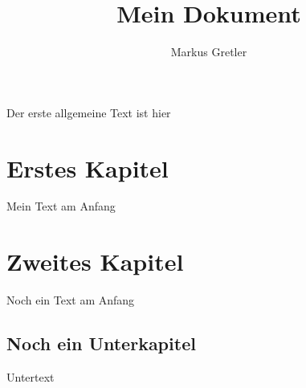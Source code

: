 \documentclass[a4paper, DIV11]{scrartcl}
\begin{document}
\author{Markus Gretler}
\date{}
\title{Mein Dokument}
\maketitle


Der erste allgemeine Text ist hier



\section{Erstes Kapitel}
Mein Text am Anfang

\section{Zweites Kapitel}
Noch ein Text am Anfang

\subsection{Noch ein Unterkapitel}
Untertext

\end{document}
